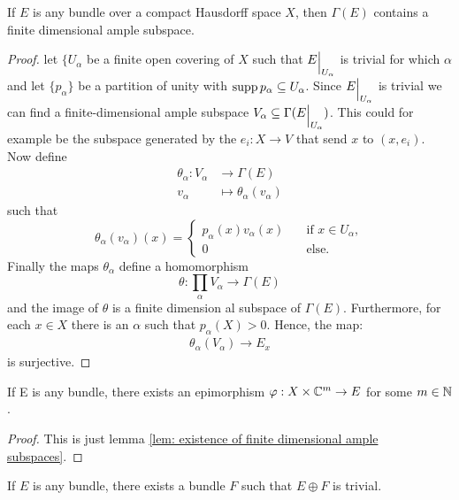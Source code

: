 \begin{lemma}\label{lem: existence of finite dimensional ample subspaces}
	If $E$ is any bundle over a compact Hausdorff space $X$, then $\Gamma(E)$ contains a finite dimensional ample subspace.
\end{lemma}
\begin{proof}
	let $\{U_{\alpha}$ be a finite open covering of $X$ such that ${E}\einsch{U_{\alpha}}$ is trivial for which $\alpha$ and let $\{p_{\alpha}\}$ be a partition of unity with $\operatorname{\mathrm{supp}} p_{\alpha}\subseteq U_{\alpha}$. Since ${E}\einsch{U_ {\alpha}}$ is trivial we can find a finite-dimensional ample subspace $V_{\alpha}\subseteq \Gamma({E}\einsch{U_{\alpha}})$. This could for example be the subspace generated by the $e_i:X\to V$ that send $x$ to $(x,e_i)$. Now define 
	\begin{align*}
		\theta_{\alpha}: V_{\alpha} & \to \Gamma(E)\\
		v_{\alpha}                  &\mapsto \theta_{\alpha}(v_{\alpha})
	\end{align*} such that 
	\begin{equation*}
		\theta_{\alpha}(v_{\alpha})(x)=\begin{cases}
			p_{\alpha}(x)v_{\alpha}(x) & \quad \text{if }x\in U_{\alpha},\\
			0                          & \quad \text{else}.
		\end{cases}    
	\end{equation*}
	Finally the maps $\theta_{\alpha}$ define a homomorphism
	\begin{equation*}
		\theta:\prod_{\alpha}V_{\alpha}\to \Gamma(E)
	\end{equation*}  and the image of $\theta$ is a finite dimension al subspace of $\Gamma(E)$. Furthermore, for each $x\in X$ there is an $\alpha$ such that $p_{\alpha}(X)>0$. Hence, the map:
	\begin{align*}
		\theta_{\alpha}(V_{\alpha})\to E_x
	\end{align*} is surjective.
\end{proof}
\begin{cor}
	If E is any bundle, there exists an epimorphism $\varphi: X \times \mathbb{C}^m\to E$ for some $m\in \mathbb{N}$.
\end{cor}
\begin{proof}
	This is just lemma \ref{lem: existence of finite dimensional ample subspaces}.
\end{proof}
\begin{cor}
	If $E$ is any bundle, there exists a bundle $F$ such that $E\oplus F$ is trivial.
\end{cor}
